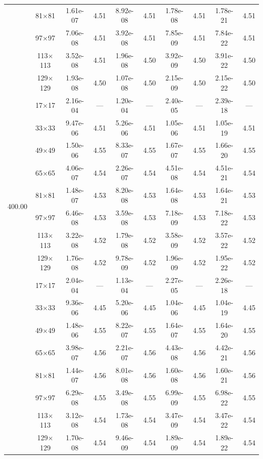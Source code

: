 \begin{table}[H]
{\begin{tabular*}{\textwidth}{@{\extracolsep\fill}c|c|cc|cc|cc|cc@{}}
                & 81$\times$81 & 1.61e-07 & 4.51 & 8.92e-08 & 4.51 & 1.78e-08 & 4.51 & 1.78e-21 & 4.51 \\
                & 97$\times$97 & 7.06e-08 & 4.51 & 3.92e-08 & 4.51 & 7.85e-09 & 4.51 & 7.84e-22 & 4.51 \\
                & 113$\times$113 & 3.52e-08 & 4.51 & 1.96e-08 & 4.50 & 3.92e-09 & 4.50 & 3.91e-22 & 4.50 \\
                & 129$\times$129 & 1.93e-08 & 4.50 & 1.07e-08 & 4.50 & 2.15e-09 & 4.50 & 2.15e-22 & 4.50 \\
                \midrule
                \multirow{10}{*}{400.00} & 17$\times$17 & 2.16e-04 & --- & 1.20e-04 & --- & 2.40e-05 & --- & 2.39e-18 & --- \\
                & 33$\times$33 & 9.47e-06 & 4.51 & 5.26e-06 & 4.51 & 1.05e-06 & 4.51 & 1.05e-19 & 4.51 \\
                & 49$\times$49 & 1.50e-06 & 4.55 & 8.33e-07 & 4.55 & 1.67e-07 & 4.55 & 1.66e-20 & 4.55 \\
                & 65$\times$65 & 4.06e-07 & 4.54 & 2.26e-07 & 4.54 & 4.51e-08 & 4.54 & 4.51e-21 & 4.54 \\
                & 81$\times$81 & 1.48e-07 & 4.53 & 8.20e-08 & 4.53 & 1.64e-08 & 4.53 & 1.64e-21 & 4.53 \\
                & 97$\times$97 & 6.46e-08 & 4.53 & 3.59e-08 & 4.53 & 7.18e-09 & 4.53 & 7.18e-22 & 4.53 \\
                & 113$\times$113 & 3.22e-08 & 4.52 & 1.79e-08 & 4.52 & 3.58e-09 & 4.52 & 3.57e-22 & 4.52 \\
                & 129$\times$129 & 1.76e-08 & 4.52 & 9.78e-09 & 4.52 & 1.96e-09 & 4.52 & 1.95e-22 & 4.52 \\
                \midrule
                \multirow{10}{*}{1000.00} & 17$\times$17 & 2.04e-04 & --- & 1.13e-04 & --- & 2.27e-05 & --- & 2.26e-18 & --- \\
                & 33$\times$33 & 9.36e-06 & 4.45 & 5.20e-06 & 4.45 & 1.04e-06 & 4.45 & 1.04e-19 & 4.45 \\
                & 49$\times$49 & 1.48e-06 & 4.55 & 8.22e-07 & 4.55 & 1.64e-07 & 4.55 & 1.64e-20 & 4.55 \\
                & 65$\times$65 & 3.98e-07 & 4.56 & 2.21e-07 & 4.56 & 4.43e-08 & 4.56 & 4.42e-21 & 4.56 \\
                & 81$\times$81 & 1.44e-07 & 4.56 & 8.01e-08 & 4.56 & 1.60e-08 & 4.56 & 1.60e-21 & 4.56 \\
                & 97$\times$97 & 6.29e-08 & 4.55 & 3.49e-08 & 4.55 & 6.99e-09 & 4.55 & 6.98e-22 & 4.55 \\
                & 113$\times$113 & 3.12e-08 & 4.54 & 1.73e-08 & 4.54 & 3.47e-09 & 4.54 & 3.47e-22 & 4.54 \\
                & 129$\times$129 & 1.70e-08 & 4.54 & 9.46e-09 & 4.54 & 1.89e-09 & 4.54 & 1.89e-22 & 4.54 \\
                \bottomrule
            \end{tabular*}
	}{%
	\fdadospesquisa
	}
\end{table}

